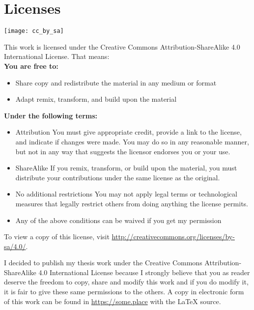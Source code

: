 
\pagestyle{empty}
\chapter*{Licenses}
\vspace{-20pt}
\begin{center}
 \texttt{[image: cc\_by\_sa]}
\end{center}\vspace{-32pt}
This work is licensed under the Creative Commons Attribution-ShareAlike 4.0 International License. That means:\\
\textbf{You are free to:}
\vspace{-17pt} \begin{itemize}
\item Share \textemdash copy and redistribute the material in any medium or format
\item Adapt \textemdash remix, transform, and build upon the material
\end{itemize}\vspace{-17pt}

\textbf{Under the following terms:}
\vspace{-17pt} \begin{itemize}
\item Attribution \textemdash You must give appropriate credit, provide a link to the license, and indicate if changes were made. You may do so in any reasonable manner, but not in any way that suggests the licensor endorses you or your use.
\item ShareAlike \textemdash If you remix, transform, or build upon the material, you must distribute your contributions under the same license as the original.
\item No additional restrictions \textemdash You may not apply legal terms or technological measures that legally restrict others from doing anything the license permits.
\item Any of the above conditions can be waived if you get my permission
\end{itemize}%


To view a copy of this license, visit \url{http://creativecommons.org/licenses/by-sa/4.0/}.

I decided to publish my thesis work under the Creative Commons Attribution-ShareAlike 4.0 International License because I strongly believe that you as reader deserve the freedom to copy, share and modify this work and if you do modify it, it is fair to give these same permissions to the others. A copy in electronic form of this work can be found in \url{https://some.place} with the \LaTeX{} source.

\clearpage

